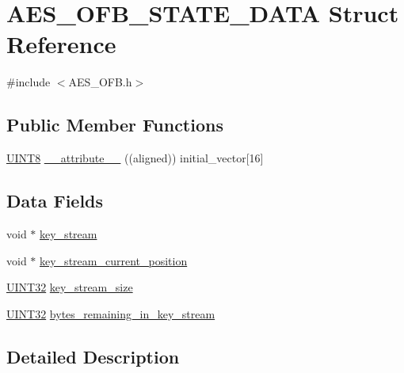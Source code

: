 \hypertarget{struct_a_e_s___o_f_b___s_t_a_t_e___d_a_t_a}{}\section{A\+E\+S\+\_\+\+O\+F\+B\+\_\+\+S\+T\+A\+T\+E\+\_\+\+D\+A\+T\+A Struct Reference}
\label{struct_a_e_s___o_f_b___s_t_a_t_e___d_a_t_a}


{\ttfamily \#include $<$A\+E\+S\+\_\+\+O\+F\+B.\+h$>$}

\subsection*{Public Member Functions}
\begin{DoxyCompactItemize}
\item 
\hyperlink{_generic_type_defs_8h_ab27e9918b538ce9d8ca692479b375b6a}{U\+I\+N\+T8} \hyperlink{struct_a_e_s___o_f_b___s_t_a_t_e___d_a_t_a_a1e8ba219ef73e2cc268297047c8a07fe}{\+\_\+\+\_\+attribute\+\_\+\+\_\+} ((aligned)) initial\+\_\+vector\mbox{[}16\mbox{]}
\end{DoxyCompactItemize}
\subsection*{Data Fields}
\begin{DoxyCompactItemize}
\item 
void $\ast$ \hyperlink{struct_a_e_s___o_f_b___s_t_a_t_e___d_a_t_a_ac723120d7ded590dad56ce7c68bad1fb}{key\+\_\+stream}
\item 
void $\ast$ \hyperlink{struct_a_e_s___o_f_b___s_t_a_t_e___d_a_t_a_a3c812318caf3958da111ac64c4cd17c0}{key\+\_\+stream\+\_\+current\+\_\+position}
\item 
\hyperlink{_generic_type_defs_8h_a1720f33f59b583f0c2ed071815623a86}{U\+I\+N\+T32} \hyperlink{struct_a_e_s___o_f_b___s_t_a_t_e___d_a_t_a_a7eb68e0d44cc46f9d21543bfa2edf0e4}{key\+\_\+stream\+\_\+size}
\item 
\hyperlink{_generic_type_defs_8h_a1720f33f59b583f0c2ed071815623a86}{U\+I\+N\+T32} \hyperlink{struct_a_e_s___o_f_b___s_t_a_t_e___d_a_t_a_a7c5a67b278684e56128c4c4976914d42}{bytes\+\_\+remaining\+\_\+in\+\_\+key\+\_\+stream}
\end{DoxyCompactItemize}


\subsection{Detailed Description}


